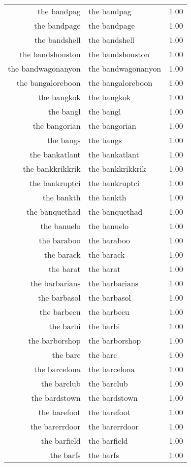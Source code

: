 \begin{table}[ht]
\begin{tabular}{rlr}
  the bandpag & the bandpag & 1.00 \\ 
  the bandpage & the bandpage & 1.00 \\ 
  the bandshell & the bandshell & 1.00 \\ 
  the bandshouston & the bandshouston & 1.00 \\ 
  the bandwagonanyon & the bandwagonanyon & 1.00 \\ 
  the bangaloreboon & the bangaloreboon & 1.00 \\ 
  the bangkok & the bangkok & 1.00 \\ 
  the bangl & the bangl & 1.00 \\ 
  the bangorian & the bangorian & 1.00 \\ 
  the bangs & the bangs & 1.00 \\ 
  the bankatlant & the bankatlant & 1.00 \\ 
  the bankkrikkrik & the bankkrikkrik & 1.00 \\ 
  the bankruptci & the bankruptci & 1.00 \\ 
  the bankth & the bankth & 1.00 \\ 
  the banquethad & the banquethad & 1.00 \\ 
  the banuelo & the banuelo & 1.00 \\ 
  the baraboo & the baraboo & 1.00 \\ 
  the barack & the barack & 1.00 \\ 
  the barat & the barat & 1.00 \\ 
  the barbarians & the barbarians & 1.00 \\ 
  the barbasol & the barbasol & 1.00 \\ 
  the barbecu & the barbecu & 1.00 \\ 
  the barbi & the barbi & 1.00 \\ 
  the barborshop & the barborshop & 1.00 \\ 
  the barc & the barc & 1.00 \\ 
  the barcelona & the barcelona & 1.00 \\ 
  the barclub & the barclub & 1.00 \\ 
  the bardstown & the bardstown & 1.00 \\ 
  the barefoot & the barefoot & 1.00 \\ 
  the barerrdoor & the barerrdoor & 1.00 \\ 
  the barfield & the barfield & 1.00 \\ 
  the barfs & the barfs & 1.00 \\ 

\end{tabular}
\end{table}
